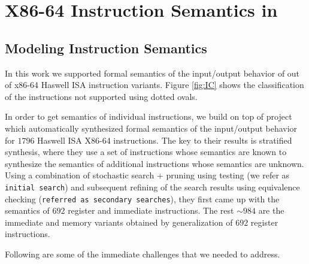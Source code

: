 
\section{X86-64 Instruction Semantics in \K} \label{sec:modelI}

\subsection{Modeling Instruction Semantics}


In this work we supported formal semantics of the input/output behavior of
\supp{} out of \total{} x86-64 Haswell ISA instruction variants. Figure \ref{fig:IC} shows the classification of the instructions not supported using dotted ovals.  


In order to get semantics of individual instructions, we build on top of project
\Strata~\cite{Heule2016a} which automatically synthesized formal semantics  of
the input/output behavior for $1796$ Haswell ISA X86-64 instructions. The key to
their results is stratified synthesis, where they use a set of instructions
whose semantics are known to synthesize the semantics of additional instructions
whose semantics are unknown. Using a  combination of stochastic search + pruning
using testing (we refer as {\tt initial search}) and subsequent refining of the
search results using equivalence checking ({\tt referred as secondary
    searches}), they first came up with the semantics of $692$ register and
 immediate instructions. The rest $\sim984$ are the immediate
and memory variants obtained by generalization of $692$ register instructions.     



Following are some of the immediate challenges that we needed to address.

